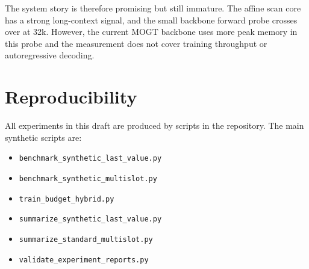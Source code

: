 \documentclass[10pt]{article}
\newcommand{\mogt}{MOGT}
\begin{document}
The system story is therefore promising but still immature. The affine scan
core has a strong long-context signal, and the small backbone forward probe
crosses over at 32k. However, the current \mogt{} backbone uses more peak
memory in this probe and the measurement does not cover training throughput or
autoregressive decoding.

\section{Reproducibility}

All experiments in this draft are produced by scripts in the repository. The
main synthetic scripts are:
\begin{itemize}
    \item \texttt{benchmark\_synthetic\_last\_value.py}
    \item \texttt{benchmark\_synthetic\_multislot.py}
    \item \texttt{train\_budget\_hybrid.py}
    \item \texttt{summarize\_synthetic\_last\_value.py}
    \item \texttt{summarize\_standard\_multislot.py}
    \item \texttt{validate\_experiment\_reports.py}
\end{itemize}
\end{document}
